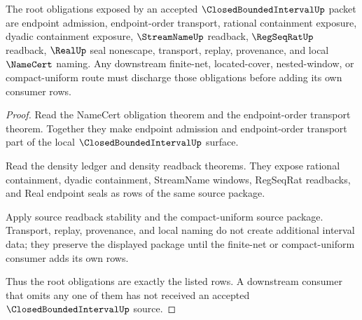 \begin{theorem}
\label{thm:closed-bounded-interval-root-unblock-obligations}
The root obligations exposed by an accepted $\ClosedBoundedIntervalUp$ packet are endpoint admission, endpoint-order transport, rational containment exposure, dyadic containment exposure, $\StreamNameUp$ readback, $\RegSeqRatUp$ readback, $\RealUp$ seal nonescape, transport, replay, provenance, and local $\NameCert$ naming. Any downstream finite-net, located-cover, nested-window, or compact-uniform route must discharge those obligations before adding its own consumer rows.
\end{theorem}
\begin{proof}
Read the NameCert obligation theorem and the endpoint-order transport theorem. Together they make endpoint admission and endpoint-order transport part of the local $\ClosedBoundedIntervalUp$ surface.

Read the density ledger and density readback theorems. They expose rational containment, dyadic containment, StreamName windows, RegSeqRat readbacks, and Real endpoint seals as rows of the same source package.

Apply source readback stability and the compact-uniform source package. Transport, replay, provenance, and local naming do not create additional interval data; they preserve the displayed package until the finite-net or compact-uniform consumer adds its own rows.

Thus the root obligations are exactly the listed rows. A downstream consumer that omits any one of them has not received an accepted $\ClosedBoundedIntervalUp$ source.
\end{proof}


